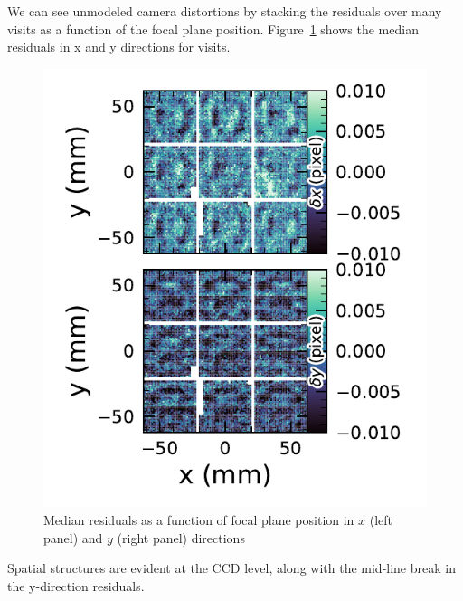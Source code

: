 We can see unmodeled \gls{camera} distortions by stacking the residuals over many visits as a function of the focal plane position.
Figure~\ref{fig:Astrometry_FoV} shows the median residuals in x and y directions for \nvisits visits.
\begin{figure}[htb!]
\centering
\includegraphics[width=\linewidth]{Astrometry_FoV.pdf}
\caption{Median residuals as a function of focal plane position in $x$ (left panel) and $y$ (right panel) directions}
\label{fig:Astrometry_FoV}
\end{figure}
Spatial structures are evident at the \gls{CCD} level, along with the mid-line break in the y-direction residuals.

